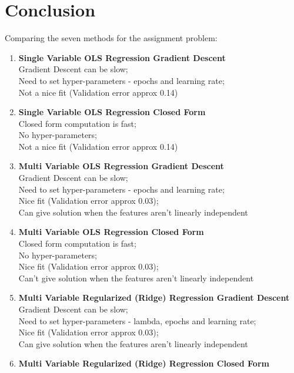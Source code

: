 \documentclass[12pt, fleqn]{article}
\begin{document}
\section{Conclusion}
Comparing the seven methods for the assignment problem:
\begin{enumerate}
  \item \textbf{Single Variable OLS Regression Gradient Descent} \\
        Gradient Descent can be slow; \\
        Need to set hyper-parameters - epochs and learning rate; \\
        Not a nice fit (Validation error approx 0.14)
  \item \textbf{Single Variable OLS Regression Closed Form} \\
        Closed form computation is fast; \\
        No hyper-parameters; \\
        Not a nice fit (Validation error approx 0.14)
  \item \textbf{Multi Variable OLS Regression Gradient Descent} \\
        Gradient Descent can be slow; \\
        Need to set hyper-parameters - epochs and learning rate; \\
        Nice fit (Validation error approx 0.03); \\
        Can give solution when the features aren't linearly independent
  \item \textbf{Multi Variable OLS Regression Closed Form} \\
        Closed form computation is fast; \\
        No hyper-parameters; \\
        Nice fit (Validation error approx 0.03); \\
        Can't give solution when the features aren't linearly independent
  \item \textbf{Multi Variable Regularized (Ridge) Regression Gradient Descent} \\
        Gradient Descent can be slow; \\
        Need to set hyper-parameters - lambda, epochs and learning rate; \\
        Nice fit (Validation error approx 0.03); \\
        Can give solution when the features aren't linearly independent
  \item \textbf{Multi Variable Regularized (Ridge) Regression Closed Form} \\

\end{enumerate}
\end{document}
